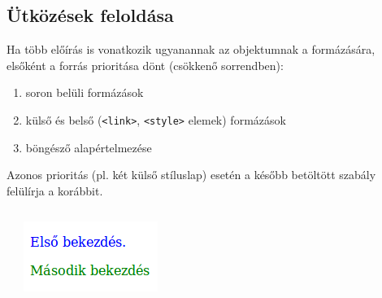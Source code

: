 \begin{frame}
  \begin{exampleblock}{}
    \footnotesize
    
    
  \end{exampleblock}
\end{frame}

\subsection{Ütközések feloldása}

\begin{frame}
  Ha több előírás is vonatkozik ugyanannak az objektumnak a formázására, elsőként a forrás prioritása dönt (csökkenő sorrendben):
  \begin{enumerate}
    \item soron belüli formázások
    \item külső és belső (\texttt{<link>}, \texttt{<style>} elemek) formázások
    \item böngésző alapértelmezése
  \end{enumerate}
  Azonos prioritás (pl. két külső stíluslap) esetén a később betöltött szabály felülírja a korábbit.
\end{frame}

\begin{frame}
  \begin{exampleblock}{}
    \scriptsize
    
  \end{exampleblock}
  \begin{columns}[T]
      \begin{exampleblock}{}
        \scriptsize
        
      \end{exampleblock}
      \includegraphics[width=.66\textwidth]{utkozes1.png}
  \end{columns} 
\end{frame}

